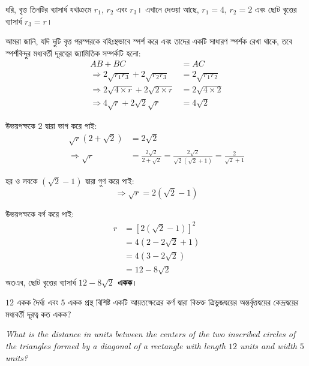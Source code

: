 \documentclass[12pt, a4paper]{article}
\begin{document}
\begin{tcolorbox}[solutionbox={সমাধান (Solution)}]
    \noindent
    ধরি, বৃত্ত তিনটির ব্যাসার্ধ যথাক্রমে $r_1$, $r_2$ এবং $r_3$। এখানে দেওয়া আছে, $r_1 = 4$, $r_2 = 2$ এবং ছোট বৃত্তের ব্যাসার্ধ $r_3 = r$।
    
    \vspace{0.5em}
    আমরা জানি, যদি দুটি বৃত্ত পরস্পরকে বহিঃস্থভাবে স্পর্শ করে এবং তাদের একটি সাধারণ স্পর্শক রেখা থাকে, তবে স্পর্শবিন্দুর মধ্যবর্তী দূরত্বের জ্যামিতিক সম্পর্কটি হলো:
    \begin{align*}
        AB + BC &= AC \\
        \Rightarrow 2\sqrt{r_1 r_3} + 2\sqrt{r_2 r_3} &= 2\sqrt{r_1 r_2} \\
        \Rightarrow 2\sqrt{4 \times r} + 2\sqrt{2 \times r} &= 2\sqrt{4 \times 2} \\
        \Rightarrow 4\sqrt{r} + 2\sqrt{2}\sqrt{r} &= 4\sqrt{2}
    \end{align*}
    
    উভয়পক্ষকে $2$ দ্বারা ভাগ করে পাই:
    \begin{align*}
        \sqrt{r}(2 + \sqrt{2}) &= 2\sqrt{2} \\
        \Rightarrow \sqrt{r} &= \frac{2\sqrt{2}}{2 + \sqrt{2}} = \frac{2\sqrt{2}}{\sqrt{2}(\sqrt{2} + 1)} = \frac{2}{\sqrt{2} + 1}
    \end{align*}
    
    হর ও লবকে $(\sqrt{2} - 1)$ দ্বারা গুণ করে পাই:
    \[ \Rightarrow \sqrt{r} = 2(\sqrt{2} - 1) \]
    
    উভয়পক্ষকে বর্গ করে পাই:
    \begin{align*}
        r &= \left[2(\sqrt{2} - 1)\right]^2 \\
          &= 4(2 - 2\sqrt{2} + 1) \\
          &= 4(3 - 2\sqrt{2}) \\
          &= 12 - 8\sqrt{2}
    \end{align*}
    অতএব, ছোট বৃত্তের ব্যাসার্ধ \textbf{$12 - 8\sqrt{2}$ একক}।
\end{tcolorbox}


\begin{tcolorbox}[questionbox={প্রশ্ন (Question) 2}]
    \noindent
    $12$ একক দৈর্ঘ্য এবং $5$ একক প্রস্থ বিশিষ্ট একটি আয়তক্ষেত্রের কর্ণ দ্বারা বিভক্ত ত্রিভুজদ্বয়ের অন্তর্বৃত্তদ্বয়ের কেন্দ্রদ্বয়ের মধ্যবর্তী দূরত্ব কত একক?
    
    \vspace{0.8em}
    \begin{english}
    \noindent\textit{\color{darkgray}
    What is the distance in units between the centers of the two inscribed circles of the triangles formed by a diagonal of a rectangle with length $12$ units and width $5$ units?
    }
    \end{english}
\end{tcolorbox}
\end{document}
